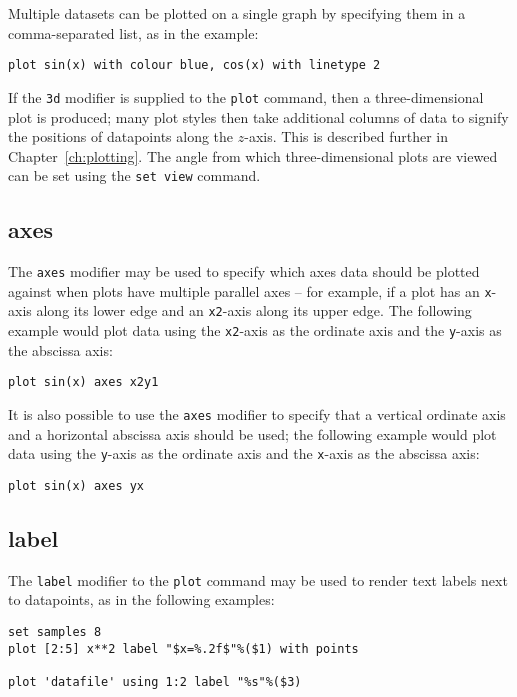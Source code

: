 Multiple datasets can be plotted on a single graph by specifying them in a
comma-separated list, as in the example:

\begin{verbatim}
plot sin(x) with colour blue, cos(x) with linetype 2
\end{verbatim}

If the {\tt 3d} modifier is supplied to the {\tt plot} command, then a
three-dimensional plot is produced; many plot styles then take additional
columns of data to signify the positions of datapoints along the $z$-axis. This
is described further in Chapter~\ref{ch:plotting}. The angle from which
three-dimensional plots are viewed can be set using the {\tt set view} command.


\subsection{axes}

The {\tt axes} modifier may be used to specify which axes data should be
plotted against when plots have multiple parallel axes -- for example, if a
plot has an {\tt x}-axis along its lower edge and an {\tt x2}-axis along its
upper edge. The following example would plot data using the {\tt x2}-axis as
the ordinate axis and the {\tt y}-axis as the abscissa axis:

\begin{verbatim}
plot sin(x) axes x2y1
\end{verbatim}

\noindent It is also possible to use the {\tt axes} modifier to specify that a
vertical ordinate axis and a horizontal abscissa axis should be used; the
following example would plot data using the {\tt y}-axis as the ordinate axis
and the {\tt x}-axis as the abscissa axis:

\begin{verbatim}
plot sin(x) axes yx
\end{verbatim}


\subsection{label}

The {\tt label} modifier to the {\tt plot} command may be used to render text 
labels next to datapoints, as in the following examples:
\begin{verbatim}
set samples 8
plot [2:5] x**2 label "$x=%.2f$"%($1) with points

plot 'datafile' using 1:2 label "%s"%($3)
\end{verbatim}

